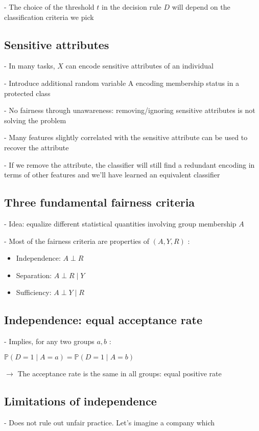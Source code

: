 - The choice of the threshold $t$ in the decision rule $D$ will depend on the classification criteria we pick

\subsection*{Sensitive attributes}
- In many tasks, $X$ can encode sensitive attributes of an individual

- Introduce additional random variable A encoding membership status in a protected class

- No fairness through unawareness: removing/ignoring sensitive attributes is not solving the problem

- Many features slightly correlated with the sensitive attribute can be used to recover the attribute

- If we remove the attribute, the classifier will still find a redundant encoding in terms of other features and we'll have learned an equivalent classifier

\subsection*{Three fundamental fairness criteria}
- Idea: equalize different statistical quantities involving group membership $A$

- Most of the fairness criteria are properties of $(A, Y, R)$ :

\begin{itemize}
  \item Independence: $A \perp R$
  \item Separation: $A \perp R \mid Y$
  \item Sufficiency: $A \perp Y \mid R$
\end{itemize}

\subsection*{Independence: equal acceptance rate}

- Implies, for any two groups $a, b$ :

$
\mathbb{P}(D=1 \mid A=a)=\mathbb{P}(D=1 \mid A=b)
$

$\rightarrow$ The acceptance rate is the same in all groups: equal positive rate

\subsection*{Limitations of independence}
- Does not rule out unfair practice. Let's imagine a company which

